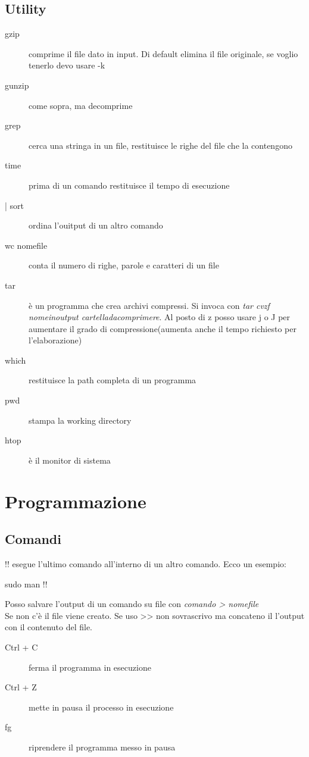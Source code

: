 \section{Utility}
\begin{description}
\item [gzip] comprime il file dato in input. Di default elimina il file originale, se voglio tenerlo devo usare -k
\item [gunzip] come sopra, ma decomprime
\item [grep] cerca una stringa in un file, restituisce le righe del file che la contengono
\item [time] prima di un comando restituisce il tempo di esecuzione
\item [| sort] ordina l'ouitput di un altro comando
\item [wc nomefile] conta il numero di righe, parole e caratteri di un file
\item [tar] è un programma che crea archivi compressi. Si invoca con \textit{tar cvzf nomeinoutput cartelladacomprimere}. Al posto di z posso usare j o J per aumentare il grado di compressione(aumenta anche il tempo richiesto per l'elaborazione)
\item [which] restituisce la path completa di un programma
\item [pwd] stampa la working directory
\item [htop] è il monitor di sistema
\end{description}

\chapter{Programmazione}
\section{Comandi}
!! esegue l'ultimo comando all'interno di un altro comando. Ecco un esempio:
\begin{tcolorbox}
sudo man !!
\end{tcolorbox}
Posso salvare l'output di un comando su file con \textit{comando > nomefile}\\
Se non c'è il file viene creato. Se uso >> non sovrascrivo ma concateno il l'output con il contenuto del file.

\begin{description}
\item [Ctrl + C] ferma il programma in esecuzione
\item [Ctrl + Z] mette in pausa il processo in esecuzione 
\item [fg] riprendere il programma messo in pausa
\end{description}
